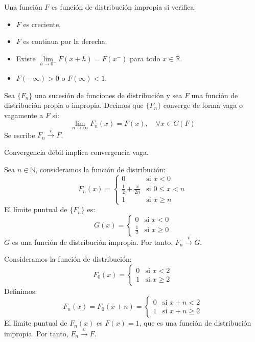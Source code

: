 \begin{definition}
    Una función $F$ es función de distribución impropia si verifica:
    \begin{itemize}
        \item $F$ es creciente.
        \item $F$ es continua por la derecha.
        \item Existe $\lim\limits_{h \to 0^-} F(x+h) = F(x^-)$ para todo $x \in \mathbb{R}$.
        \item $F(-\infty) > 0$ o $F(\infty) < 1$.
    \end{itemize}
\end{definition}

\begin{definition}
    Sea $\{F_n\}$ una sucesión de funciones de distribución y sea $F$ una función de distribución propia o impropia.
    Decimos que $\{F_n\}$ converge de forma vaga o vagamente a $F$ si:
    $$\lim\limits_{n \to \infty} F_n(x) = F(x), \quad \forall x \in C(F)$$
    Se escribe $F_n \xrightarrow{v} F$.
\end{definition}

\begin{remark}
    Convergencia débil implica convergencia vaga.
\end{remark}

\begin{example}
    Sea $n \in \mathbb{N}$, consideramos la función de distribución:
    $$F_n(x) = \begin{cases}
            0                          & \text{si } x < 0        \\
            \frac{1}{2} + \frac{x}{2n} & \text{si } 0 \leq x < n \\
            1                          & \text{si } x \geq n
        \end{cases}$$
    El límite puntual de $\{F_n\}$ es:
    $$G(x) = \begin{cases}
            0           & \text{si } x < 0    \\
            \frac{1}{2} & \text{si } x \geq 0
        \end{cases}$$
    $G$ es una función de distribución impropia.
    Por tanto, $F_n \xrightarrow{v} G$.
\end{example}

\begin{example}
    Consideramos la función de distribución:
    $$F_0(x) = \begin{cases}
            0 & \text{si } x < 2    \\
            1 & \text{si } x \geq 2
        \end{cases}$$
    Definimos:
    $$F_n(x) = F_0(x+n) = \begin{cases}
            0 & \text{si } x+n < 2    \\
            1 & \text{si } x+n \geq 2
        \end{cases}$$
    El límite puntual de $F_n(x)$ es $F(x) = 1$, que es una función de distribución impropia.
    Por tanto, $F_n \xrightarrow{v} F$.
\end{example}

